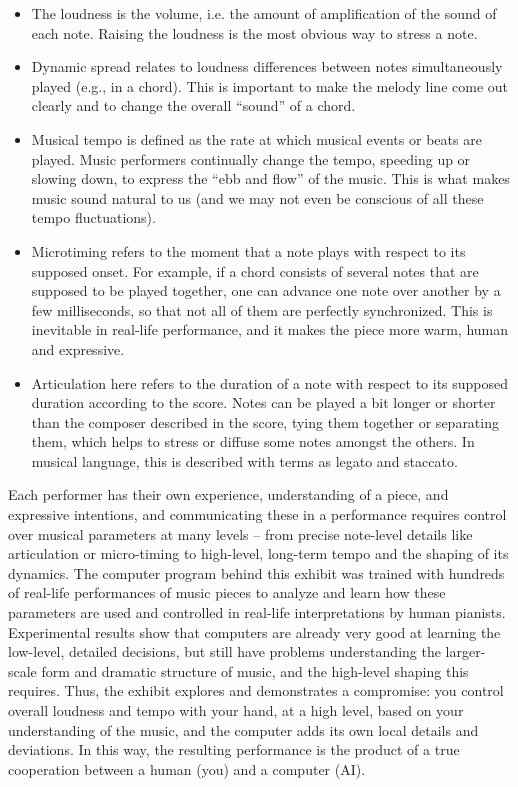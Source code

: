 \begin{itemize}
\item The loudness is the volume, i.e. the amount of amplification of the sound of each note. Raising the loudness is the most obvious way to stress a note.

\item Dynamic spread relates to loudness differences between notes simultaneously played (e.g., in a chord). This is important to make the melody line come out clearly and to change the overall ``sound'' of a chord.

\item Musical tempo is defined as the rate at which musical events or beats are played. Music performers continually change the tempo, speeding up or slowing down, to express the ``ebb and flow'' of the music. This is what makes music sound natural to us (and we may not even be conscious of all these tempo fluctuations).

\item Microtiming refers to the moment that a note plays with respect to its supposed onset. For example, if a chord consists of several notes that are supposed to be played together, one can advance one note over another by a few milliseconds, so that not all of them are perfectly synchronized. This is inevitable in real-life performance, and it makes the piece more warm, human and expressive.

\item Articulation here refers to the duration of a note with respect to its supposed duration according to the score. Notes can be played a bit longer or shorter than the composer described in the score, tying them together or separating them, which helps to stress or diffuse some notes amongst the others. In musical language, this is described with terms as legato and staccato.
\end{itemize}

Each performer has their own experience, understanding of a piece, and expressive intentions, and communicating these in a performance requires control over musical parameters at many levels -- from precise note-level details like articulation or micro-timing to high-level, long-term tempo and the shaping of its dynamics. The computer program behind this exhibit was trained with hundreds of real-life performances of music pieces to analyze and learn how these parameters are used and controlled in real-life interpretations by human pianists. Experimental results show that computers are already very good at learning the low-level, detailed decisions, but still have problems understanding the larger-scale form and dramatic structure of music, and the high-level shaping this requires. Thus, the exhibit explores and demonstrates a compromise: you control overall loudness and tempo with your hand, at a high level, based on your understanding of the music, and the computer adds its own local details and deviations. In this way, the resulting performance is the product of a true cooperation between a human (you) and a computer (AI).

